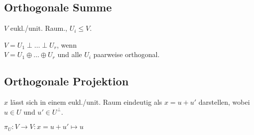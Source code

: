 \subsection*{Orthogonale Summe}
$V$ eukl./unit. Raum., $U_i \le V$.

$V = U_1 \perp \dots \perp U_r$, wenn \\
$V = U_1 \oplus \dots \oplus U_r$ und alle $U_i$ paarweise orthogonal.

\subsection*{Orthogonale Projektion}
$x$ lässt sich in einem eukl./unit. Raum eindeutig als
$x=u+u'$ darstellen, wobei $u\in U$ und $u' \in U^\perp$.

$\pi_U:V\to V: x=u+u' \mapsto u$
